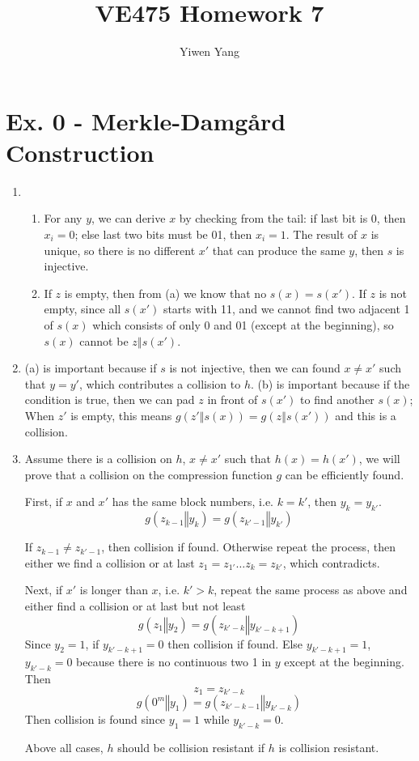 \documentclass[12pt]{article}
\title{VE475 Homework 7}
\author{Yiwen Yang}
\begin{document}
\date{}
\maketitle

\section*{Ex. 0 - Merkle-Damgård Construction}

	\begin{enumerate}
		\item
			\begin{enumerate}
				\item
					For any $y$, we can derive $x$ by checking from the tail: if last bit is 0, then $x_i=0$; else last two bits must be 01, then $x_i=1$. The result of $x$ is unique, so there is no different $x'$ that can produce the same $y$, then $s$ is injective.
				\item
					If $z$ is empty, then from (a) we know that no $s(x)=s(x')$. If $z$ is not empty, since all $s(x')$ starts with 11, and we cannot find two adjacent 1 of $s(x)$ which consists of only 0 and 01 (except at the beginning), so $s(x)$ cannot be $z\mathbin\Vert s(x')$.
				\end{enumerate}
		\item
			(a) is important because if $s$ is not injective, then we can found $x\neq x'$ such that $y=y'$, which contributes a collision to $h$. (b) is important because if the condition is true, then we can pad $z$ in front of $s(x')$ to find another $s(x)$; When $z'$ is empty, this means $g(z'\mathbin\Vert s(x))=g(z\mathbin\Vert s(x'))$ and this is a collision.
		\item
			Assume there is a collision on $h$, $x\neq x'$ such that $h(x)=h(x')$, we will prove that a collision on the compression function $g$ can be efficiently found.

			First, if $x$ and $x'$ has the same block numbers, i.e. $k=k'$, then $y_k=y_{k'}$.
			$$g(z_{k-1}\mathbin\Vert y_k)=g(z_{k'-1}\mathbin\Vert y_{k'})$$

			If $z_{k-1}\neq z_{k'-1}$, then collision if found. Otherwise repeat the process, then either we find a collision or at last $z_1=z_{1'}\ldots z_k=z_{k'}$, which contradicts.

			Next, if $x'$ is longer than $x$, i.e. $k'>k$, repeat the same process as above and either find a collision or at last but not least
			$$g(z_1\mathbin\Vert y_2)=g(z_{k'-k}\mathbin\Vert y_{k'-k+1})$$
			Since $y_2=1$, if $y_{k'-k+1}=0$ then collision if found. Else $y_{k'-k+1}=1$, $y_{k'-k}=0$ because there is no continuous two 1 in $y$ except at the beginning. Then
			$$z_1=z_{k'-k}$$
			$$g(0^m\mathbin\Vert y_1)=g(z_{k'-k-1}\mathbin\Vert y_{k'-k})$$
			Then collision is found since $y_1=1$ while $y_{k'-k}=0$.

			Above all cases, $h$ should be collision resistant if $h$ is collision resistant.
	\end{enumerate}
\end{document}
